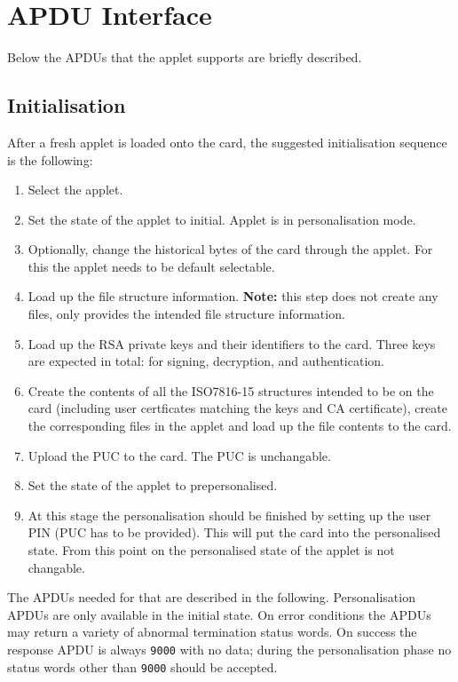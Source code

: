 \documentclass{article}
\begin{document}
\section{APDU Interface}

Below the APDUs that the applet supports are briefly described.

\subsection{Initialisation}

After a fresh applet is loaded onto the card, the suggested initialisation
sequence is the following:
\begin{enumerate}
\item Select the applet.
\item Set the state of the applet to \textsf{initial}. Applet is in personalisation mode.
\item Optionally, change the historical bytes of the card through the applet. For this the 
applet needs to be default selectable.
\item Load up the file structure information. \textbf{Note:} this step does
not create any files, only provides the intended file structure information.
\item Load up the RSA private keys and their identifiers to the card. Three keys are expected
in total: for signing, decryption, and authentication.
\item Create the contents of all the ISO7816-15 structures intended to 
be on the card (including user certficates matching the keys and CA certificate),
create the corresponding files in the applet
and load up the file contents to the card.
\item Upload the PUC to the card. The PUC is unchangable.
\item Set the state of the applet to \textsf{prepersonalised}.
\item At this stage the personalisation should be finished by setting up the user PIN (PUC has to be provided).
This will put the card into the \textsf{personalised} state. From this point on the personalised state of the
applet is not changable.
\end{enumerate}

The APDUs needed for that are described in the following. 
Personalisation APDUs are only available in the \textsf{initial} state.
On error conditions the APDUs may return a variety of abnormal termination
status words. On success the response APDU is always \texttt{9000}
with no data; during the personalisation phase
no status words other than \texttt{9000} should be accepted.
\end{document}
